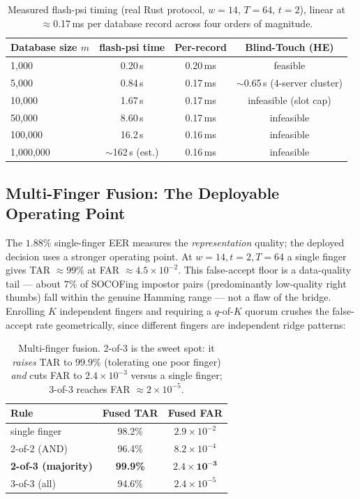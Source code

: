\documentclass[11pt]{article}
\begin{document}
\begin{table}[h]
\centering
\begin{tabular}{lccc}
\toprule
Database size $m$ & flash-psi time & Per-record & Blind-Touch (HE) \\
\midrule
1{,}000     & 0.20\,s    & 0.20\,ms & feasible \\
5{,}000     & 0.84\,s    & 0.17\,ms & $\sim$0.65\,s (4-server cluster) \\
10{,}000    & 1.67\,s    & 0.17\,ms & infeasible (slot cap) \\
50{,}000    & 8.60\,s    & 0.17\,ms & infeasible \\
100{,}000   & 16.2\,s    & 0.16\,ms & infeasible \\
1{,}000{,}000 & $\sim$162\,s (est.) & 0.16\,ms & infeasible \\
\bottomrule
\end{tabular}
\caption{Measured flash-psi timing (real Rust protocol, $w=14$, $T=64$, $t=2$), linear at
$\approx$0.17\,ms per database record across four orders of magnitude.}
\end{table}

\subsection{Multi-Finger Fusion: The Deployable Operating Point}

The $1.88\%$ single-finger EER measures the \emph{representation} quality; the deployed decision
uses a stronger operating point. At $w=14, t=2, T=64$ a single finger gives TAR $\approx 99\%$ at
FAR $\approx 4.5\times10^{-2}$. This false-accept floor is a data-quality tail --- about $7\%$ of
SOCOFing impostor pairs (predominantly low-quality right thumbs) fall within the genuine Hamming
range --- not a flaw of the bridge. Enrolling $K$ independent fingers and requiring a $q$-of-$K$
quorum crushes the false-accept rate geometrically, since different fingers are independent ridge
patterns:

\begin{table}[h]
\centering
\begin{tabular}{lcc}
\toprule
Rule & Fused TAR & Fused FAR \\
\midrule
single finger              & 98.2\% & $2.9\times10^{-2}$ \\
2-of-2 (AND)               & 96.4\% & $8.2\times10^{-4}$ \\
\textbf{2-of-3 (majority)} & \textbf{99.9\%} & $\mathbf{2.4\times10^{-3}}$ \\
3-of-3 (all)               & 94.6\% & $2.4\times10^{-5}$ \\
\bottomrule
\end{tabular}
\caption{Multi-finger fusion. 2-of-3 is the sweet spot: it \emph{raises} TAR to $99.9\%$
(tolerating one poor finger) \emph{and} cuts FAR to $2.4\times10^{-3}$ versus a single finger;
3-of-3 reaches FAR $\approx 2\times10^{-5}$.}
\end{table}
\end{document}

